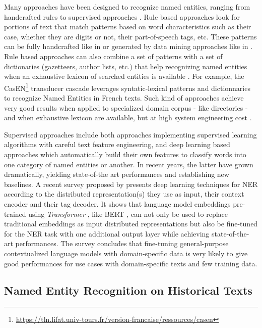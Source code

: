 Many approaches have been designed to recognize named entities, ranging from handcrafted rules to supervised approaches \cite{nadeau2007}. Rule based approaches look for portions of text that match patterns based on word characteristics such as their case, whether they are digits or not, their part-of-speech tags, etc. These patterns can be fully handcrafted like in \cite{bell2020automated} or generated by data mining approaches like in \cite{nouvel2011}. Rule based approaches can also combine a set of patterns with a set of dictionaries (gazetteers, author lists, etc.) that help recognizing named entities when an exhaustive lexicon of searched entities is available \cite{mansouri2008,maurel2011}. For example, the CasEN\footnote{\url{https://tln.lifat.univ-tours.fr/version-francaise/ressources/casen}} transducer cascade leverages syntatic-lexical patterns and dictionnaries to recognize Named Entities in French texts. Such kind of approaches achieve very good results when applied to specialized domain corpus - like directories - and when exhaustive lexicon are available, but at high system engineering cost \cite{nadeau2007}. 

Supervised approaches include both approaches implementing supervised learning algorithms with careful text feature engineering, and deep learning based approaches which automatically build their own features to classify words into one category of named entities or another. In recent years, the latter have grown dramatically, yielding state-of-the art performances and establishing new baselines\cite{li2020}. A recent survey proposed by \cite{li2020} presents deep learning techniques for NER according to the distributed representation(s) they use as input, their context encoder and their tag decoder. It shows that language model embeddings pre-trained using \textit{Transformer} \cite{vaswani2017attention}, like BERT \cite{devlin2018bert}, can not only be used to replace traditional embeddings as input distributed representations but also be fine-tuned for the NER task with one additional output layer while achieving state-of-the-art performances. The survey concludes that fine-tuning general-purpose contextualized language models with domain-specific data is very likely to give good performances for use cases with domain-specific texts and few training data.

\subsection{Named Entity Recognition on Historical Texts}


